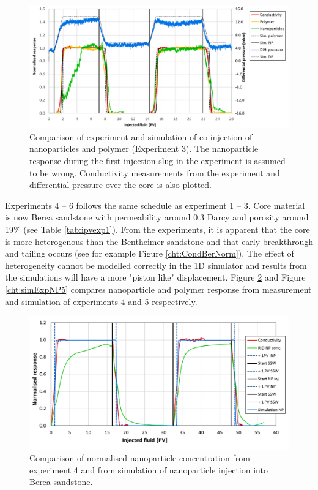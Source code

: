 \begin{figure}[h]
    \centering
    \includegraphics[width=\textwidth]{img/cht/simExpNP3.png}
    \caption{Comparison of experiment and simulation of co-injection of nanoparticles and polymer (Experiment 3). The nanoparticle response during the first injection slug in the experiment is assumed to be wrong. Conductivity measurements from the experiment and differential pressure over the core is also plotted.}
    \label{cht:simExpNP3}
\end{figure}

Experiments 4 – 6 follows the same schedule as experiment 1 – 3. Core material is now Berea sandstone with permeability around 0.3 Darcy and porosity around 19\% (see Table \ref{tab:ipvexp1}). From the experiments, it is apparent that the core is more heterogenous than the Bentheimer sandstone and that early breakthrough and tailing occurs (see for example Figure \ref{cht:CondBerNorm}). The effect of heterogeneity cannot be modelled correctly in the 1D simulator and results from the simulations will have a more "piston like" displacement. Figure \ref{cht:simExpNP4} and Figure \ref{cht:simExpNP5} compares nanoparticle and polymer response from measurement and simulation of experiments 4 and 5 respectively. 

\begin{figure}[h]
    \centering
    \includegraphics[width=\textwidth]{img/cht/simExpNP4.png}
    \caption{Comparison of normalised nanoparticle concentration from experiment 4 and from simulation of nanoparticle injection into Berea sandstone.}
    \label{cht:simExpNP4}
\end{figure}


